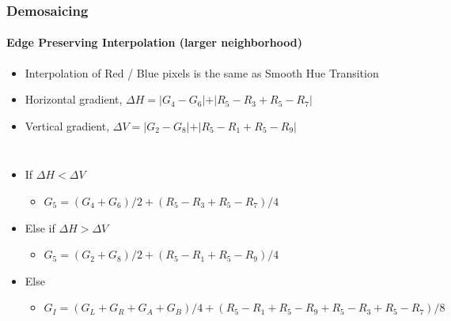 \documentclass{beamer}
\begin{document}
\begin{frame}
\frametitle{Demosaicing}
\framesubtitle{Edge Preserving Interpolation \small{(larger neighborhood)}}
\footnotesize{
\begin{itemize}
\item Interpolation of {\color{red} Red} / {\color{blue} Blue} pixels is the same as Smooth Hue Transition
\item Horizontal gradient, $\Delta H = \vert G_{4} - G_{6}\vert + \vert R_{5} - R_{3} + R_{5} - R_{7} \vert $
\item Vertical gradient, $\Delta V = \vert G_{2} - G_{8}\vert + \vert R_{5} - R_{1} + R_{5} - R_{9} \vert $
\end{itemize}
}
\begin{columns}
\footnotesize{
\begin{itemize}
\item[] If $\Delta H < \Delta V$ 
\scriptsize{
\begin{itemize}
	\item[] $G_{5} = (G_{4}+G_{6})/2 + (R_5-R_3+R_5-R_7)/4$
\end{itemize}
}
\item[] Else if $\Delta H > \Delta V$ 
\scriptsize{
\begin{itemize}
	\item[] $G_{5} =(G_{2}+G_{8})/2 + (R_{5}-R_{1}+R_{5}-R_{9})/4$
\end{itemize}
}
\item[] Else
\scriptsize{
\begin{itemize}
	\item[] $G_{I} = (G_{L}+G_{R}+G_{A}+G_{B})/4 + (R_{5}-R_{1}+R_{5}-R_{9}+R_{5}-R_{3}+R_{5}-R_{7})/8$
\end{itemize}
}
\end{itemize}
}
\end{columns}
\end{frame}
\end{document}
